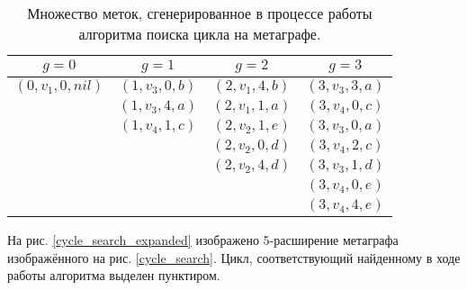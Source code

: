 \documentclass[14pt]{mmcs-article}
\begin{document}
\begin{table}[H]
    \centering
    \begin{tabular}{ | c | c | c | c | }
        \hline
        $g = 0$            & $g = 1$           & $g = 2$           & $g = 3$ \\ \hline
        $(0, v_1, 0, nil)$ & $(1, v_3,  0, b)$ & $(2, v_1,  4, b)$ & $(3, v_3,  3, a)$ \\ \hline
                           & $(1, v_3,  4, a)$ & $(2, v_1,  1, a)$ & $(3, v_4,  0, c)$ \\ \hline
                           & $(1, v_4,  1, c)$ & $(2, v_2,  1, e)$ & $(3, v_3,  0, a)$ \\ \hline
                           &                   & $(2, v_2,  0, d)$ & $(3, v_4,  2, c)$ \\ \hline
                           &                   & $(2, v_2,  4, d)$ & $(3, v_3,  1, d)$ \\ \hline
                           &                   &                   & $(3, v_4,  0, e)$ \\ \hline
                           &                   &                   & $(3, v_4,  4, e)$ \\ \hline
    \end{tabular}
    \caption{ Множество меток, сгенерированное в процессе работы алгоритма поиска цикла на метаграфе. }
    \label{cycle_search_table}
\end{table}

На рис. \ref{cycle_search_expanded} изображено 5-расширение метаграфа изображённого на рис. \ref{cycle_search}. Цикл, соответствующий найденному в ходе работы алгоритма выделен пунктиром. %
\end{document}
